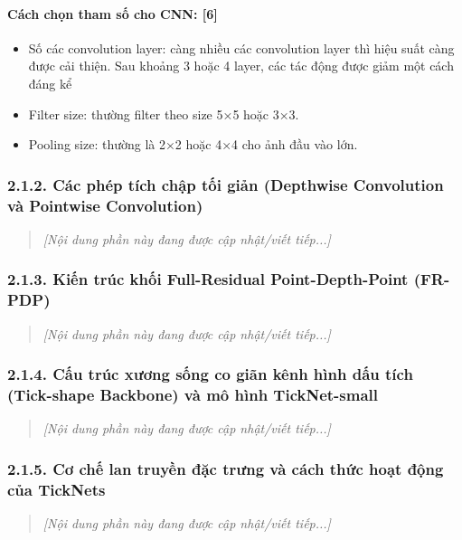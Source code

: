 \documentclass[
]{article}
\begin{document}
\paragraph{Cách chọn tham số cho CNN: {[}6{]}}\label{cuxe1ch-chux1ecdn-tham-sux1ed1-cho-cnn-6}

\begin{itemize}
\item
  Số các convolution layer: càng nhiều các convolution layer thì hiệu
  suất càng được cải thiện. Sau khoảng 3 hoặc 4 layer, các tác động được
  giảm một cách đáng kể
\item
  Filter size: thường filter theo size 5×5 hoặc 3×3.
\item
  Pooling size: thường là 2×2 hoặc 4×4 cho ảnh đầu vào lớn.
\end{itemize}

\subsubsection{2.1.2. Các phép tích chập tối giản (Depthwise Convolution và Pointwise Convolution)}\label{2-1-2-dwconv}
\begin{quote}
\emph{[Nội dung phần này đang được cập nhật/viết tiếp...]}
\end{quote}

\subsubsection{2.1.3. Kiến trúc khối Full-Residual Point-Depth-Point (FR-PDP)}\label{2-1-3-frpdp}
\begin{quote}
\emph{[Nội dung phần này đang được cập nhật/viết tiếp...]}
\end{quote}

\subsubsection{2.1.4. Cấu trúc xương sống co giãn kênh hình dấu tích (Tick-shape Backbone) và mô hình TickNet-small}\label{2-1-4-backbone}
\begin{quote}
\emph{[Nội dung phần này đang được cập nhật/viết tiếp...]}
\end{quote}

\subsubsection{2.1.5. Cơ chế lan truyền đặc trưng và cách thức hoạt động của TickNets}\label{2-1-5-propagation}
\begin{quote}
\emph{[Nội dung phần này đang được cập nhật/viết tiếp...]}
\end{quote}
\end{document}
